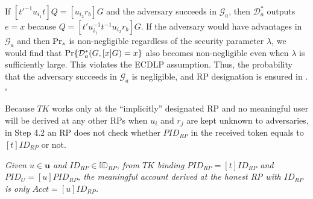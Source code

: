 If $[t'^{-1}u_{i_1}t]Q = [u_{i_2}r_{b}]G$ and the adversary succeeds in $\mathcal{G}_a$, then $\mathcal{D}^*_a$ outputs $e =x$
 because $Q = [t'u_{i_1}^{-1}t^{-1}u_{i_2}r_{b}]G$.
If the adversary would have advantages  in $\mathcal{G}_a$ and then ${\rm Pr}_s$ is non-negligible regardless of the security parameter $\lambda$,
    we would find that ${\rm Pr}\{\mathcal{D}^*_a(G, [x]G)=x\}$ also becomes non-negligible even when $\lambda$ is sufficiently large.
This violates the ECDLP assumption.
Thus, the probability that the adversary succeeds in $\mathcal{G}_a$ is negligible,
    and RP designation is ensured in \usso.
\hfill $\square$



Because $TK$ works only at the ``implicitly'' designated RP and
    no meaningful user will be derived at any other RPs when $u_i$ and $r_j$ are kept unknown to adversaries,
 in Step 4.2 an RP does not check whether $PID_{RP}$ in the received token equals to $[t]ID_{RP}$ or not.


\begin{thm} \emph{Given $u \in \mathbf{u}$ and $ID_{RP} \in \mathbb{ID}_{RP}$,
from $TK$ binding $PID_{RP}=[t]ID_{RP}$ and $PID_U = [u]PID_{RP}$,
 the meaningful account derived at the honest RP with $ID_{RP}$ 
 is only $Acct = [u]ID_{RP}$.}\label{thm-user-id}
\end{thm}



